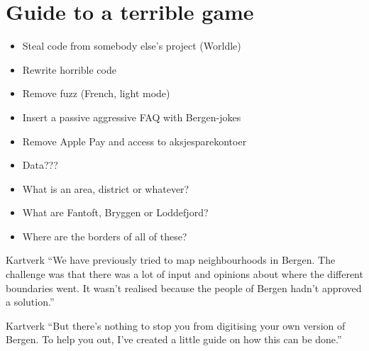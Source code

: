 \section{Guide to a terrible game}
\begin{frame}
    \begin{itemize}[<+->]
        \item Steal code from somebody else's project (Worldle)
        \item Rewrite horrible code
        \item Remove fuzz (French, light mode)
        \item Insert a passive aggressive FAQ with Bergen-jokes
        \item Remove Apple Pay and access to aksjesparekontoer
        \item Data???
        \item What is an area, district or whatever?
        \item What are Fantoft, Bryggen or Loddefjord?
        \item Where are the borders of all of these?
    \end{itemize}
\end{frame}

\begin{frame}
    \begin{block}{Kartverk}
        \enquote{We have previously tried to map neighbourhoods in Bergen. The challenge was that there was a lot of input and opinions about where the different boundaries went. It wasn't realised because the people of Bergen hadn't approved a solution.}
    \end{block}
    \pause
    \begin{block}{Kartverk}
        \enquote{But there's nothing to stop you from digitising your own version of Bergen. To help you out, I've created a little guide on how this can be done.}
    \end{block}
\end{frame}